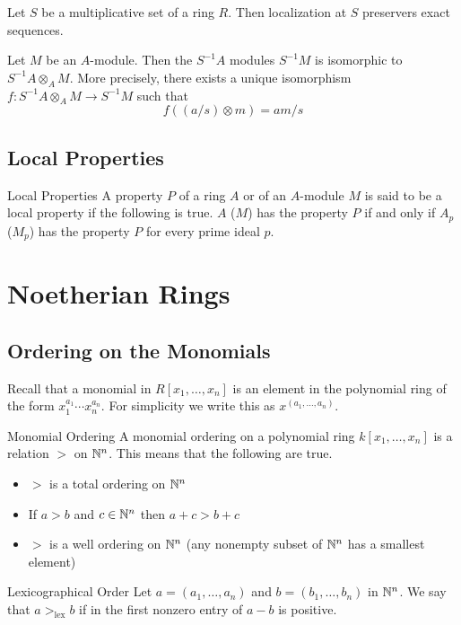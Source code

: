 \documentclass[a4paper]{article}
\begin{document}
\begin{prp}{}{} Let $S$ be a multiplicative set of a ring $R$. Then localization at $S$ preservers exact sequences. 
\end{prp}

\begin{prp}{}{} Let $M$ be an $A$-module. Then the $S^{-1}A$ modules $S^{-1}M$ is isomorphic to $S^{-1}A\otimes_AM$. More precisely, there exists a unique isomorphism $f:S^{-1}A\otimes_AM\to S^{-1}M$ such that $$f((a/s)\otimes m)=am/s$$
\end{prp}

\subsection{Local Properties}
\begin{defn}{Local Properties}{} A property $P$ of a ring $A$ or of an $A$-module $M$ is said to be a local property if the following is true. $A$ ($M$) has the property $P$ if and only if $A_p$ ($M_p$) has the property $P$ for every prime ideal $p$.
\end{defn}

\pagebreak
\section{Noetherian Rings}
\subsection{Ordering on the Monomials}
Recall that a monomial in $R[x_1,\dots,x_n]$ is an element in the polynomial ring of the form $x_1^{a_1}\cdots x_n^{a_n}$. For simplicity we write this as $x^{(a_1,\dots,a_n)}$. 

\begin{defn}{Monomial Ordering}{} A monomial ordering on a polynomial ring $k[x_1,\dots,x_n]$ is a relation $>$ on $\mathbb{N}^n$. This means that the following are true. 
\begin{itemize}
\item $>$ is a total ordering on $\mathbb{N}^n$
\item If $a>b$ and $c\in\mathbb{N}^n$ then $a+c>b+c$
\item $>$ is a well ordering on $\mathbb{N}^n$ (any nonempty subset of $\mathbb{N}^n$ has a smallest element)
\end{itemize}
\end{defn}

\begin{defn}{Lexicographical Order}{} Let $a=(a_1,\dots,a_n)$ and $b=(b_1,\dots,b_n)$ in $\mathbb{N}^n$. We say that $a>_{\text{lex}}b$ if in the first nonzero entry of $a-b$ is positive. 
\end{defn}
\end{document}
